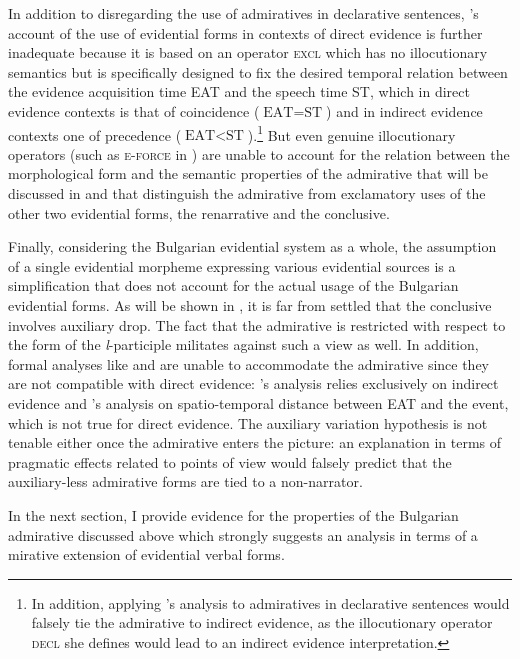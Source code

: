 \documentclass[output=paper,
colorlinks,
citecolor=brown,
newtxmath
]{langscibook}
\begin{document}
In addition to disregarding the use of admiratives in declarative sentences, \citeauthor{Smirnova2013}'s account of the use of evidential forms in contexts of direct evidence is further inadequate because it is based on an operator \textsc{excl} which has no illocutionary semantics but is specifically designed to fix the desired temporal relation between the evidence acquisition time EAT and the speech time ST, which in direct evidence contexts is that of coincidence ($\text{EAT}=\text{ST}$) and in indirect evidence contexts one of precedence ($\text{EAT}<\text{ST}$).\footnote{In addition, applying \citeauthor{Smirnova2013}'s analysis to admiratives in declarative sentences would falsely tie the admirative to indirect evidence, as the illocutionary operator \textsc{decl} she defines would lead to an indirect evidence interpretation.} But even genuine illocutionary operators (such as \textsc{e-force} in \citealt[429]{Rett2011}) are unable to account for the relation between the morphological form and the semantic properties of the admirative that will be discussed in  and that distinguish the admirative from exclamatory uses of the other two evidential forms, the renarrative and the conclusive.

Finally, considering the Bulgarian evidential system as a whole, the assumption of a single evidential morpheme expressing various evidential sources is a simplification that does not account for the actual usage of the Bulgarian evidential forms. As will be shown in , it is far from settled that the conclusive involves auxiliary drop. The fact that the admirative is restricted with respect to the form of the \textit{l}-participle militates against such a view as well. In addition, formal analyses like \citet{Izvorski1997} and \citet{Koev2017} are unable to accommodate the admirative since they are not compatible with direct evidence: \citeauthor{Izvorski1997}'s analysis relies exclusively on indirect evidence and \citeauthor{Koev2017}'s analysis on spatio-temporal distance between EAT and the event, which is not true for direct evidence. The auxiliary variation hypothesis is not tenable either once the admirative enters the picture: an explanation in terms of pragmatic effects related to points of view would falsely predict that the auxiliary-less admirative forms are tied to a non-narrator.

In the next section, I provide evidence for the properties of the Bulgarian admirative discussed above which strongly suggests an analysis in terms of a mirative extension of evidential verbal forms.
\end{document}
